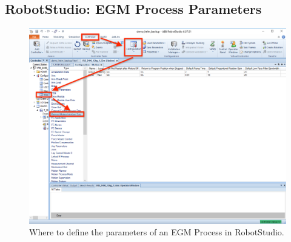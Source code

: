 \documentclass{cslthse-msc}
\begin{document}
\begin{appendices}
\section{RobotStudio: EGM Process Parameters}
\label{app:Screenshots:Process_Params}
\begin{figure}[H]
    \centering
    \includegraphics[width=12cm]{egm_connection_markup.png}
    \caption{Where to define the parameters of an EGM Process in RobotStudio.}
    \label{fig:egm_process_parameters}
\end{figure}



\end{appendices}
\end{document}
